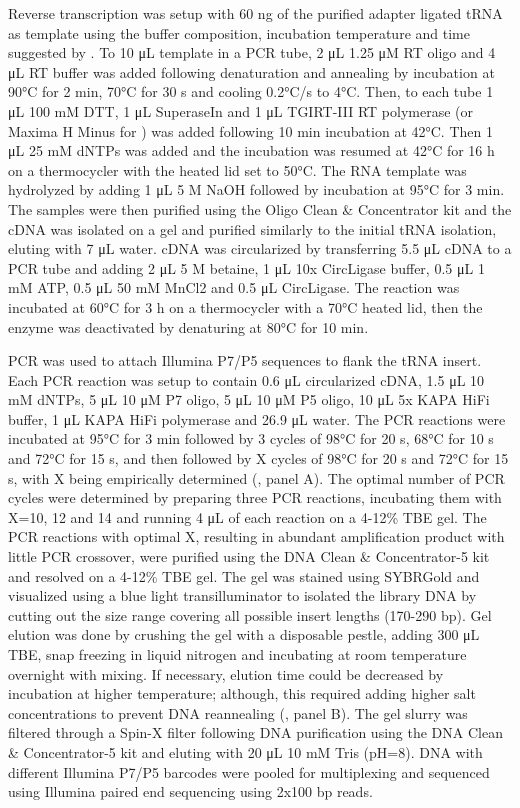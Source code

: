 \documentclass[9pt,lineno]{elife}
\begin{document}
Reverse transcription was setup with 60 ng of the purified adapter ligated tRNA as template using the buffer composition, incubation temperature and time suggested by \cite{Behrens2021-gb}.
To 10 μL template in a PCR tube, 2 μL 1.25 μM RT oligo and 4 μL RT buffer was added following denaturation and annealing by incubation at 90°C for 2 min, 70°C for 30 s and cooling 0.2°C/s to 4°C.
Then, to each tube 1 μL 100 mM DTT, 1 μL SuperaseIn and 1 μL TGIRT-III RT polymerase (or Maxima H Minus for ) was added following 10 min incubation at 42°C.
Then 1 μL 25 mM dNTPs was added and the incubation was resumed at 42°C for 16 h on a thermocycler with the heated lid set to 50°C.
The RNA template was hydrolyzed by adding 1 μL 5 M NaOH followed by incubation at 95°C for 3 min.
The samples were then purified using the Oligo Clean \& Concentrator kit and the cDNA was isolated on a gel and purified similarly to the initial tRNA isolation, eluting with 7 μL water.
cDNA was circularized by transferring 5.5 μL cDNA to a PCR tube and adding 2 μL 5 M betaine, 1 μL 10x CircLigase buffer, 0.5 μL 1 mM ATP, 0.5 μL 50 mM MnCl2 and 0.5 μL CircLigase.
The reaction was incubated at 60°C for 3 h on a thermocycler with a 70°C heated lid, then the enzyme was deactivated by denaturing at 80°C for 10 min.

PCR was used to attach Illumina P7/P5 sequences to flank the tRNA insert.
Each PCR reaction was setup to contain 0.6 μL circularized cDNA, 1.5 μL 10 mM dNTPs, 5 μL 10 μM P7 oligo, 5 μL 10 μM P5 oligo, 10 μL 5x KAPA HiFi buffer, 1 μL KAPA HiFi polymerase and 26.9 μL water.
The PCR reactions were incubated at 95°C for 3 min followed by 3 cycles of 98°C for 20 s, 68°C for 10 s and 72°C for 15 s, and then followed by X cycles of 98°C for 20 s and 72°C for 15 s, with X being empirically determined (, panel A).
The optimal number of PCR cycles were determined by preparing three PCR reactions, incubating them with X=10, 12 and 14 and running 4 μL of each reaction on a 4-12\% TBE gel.
The PCR reactions with optimal X, resulting in abundant amplification product with little PCR crossover, were purified using the DNA Clean \& Concentrator-5 kit and resolved on a 4-12\% TBE gel.
The gel was stained using SYBRGold and visualized using a blue light transilluminator to isolated the library DNA by cutting out the size range covering all possible insert lengths (170-290 bp).
Gel elution was done by crushing the gel with a disposable pestle, adding 300 μL TBE, snap freezing in liquid nitrogen and incubating at room temperature overnight with mixing.
If necessary, elution time could be decreased by incubation at higher temperature; although, this required adding higher salt concentrations to prevent DNA reannealing (, panel B).
The gel slurry was filtered through a Spin-X filter following DNA purification using the DNA Clean \& Concentrator-5 kit and eluting with 20 μL 10 mM Tris (pH=8).
DNA with different Illumina P7/P5 barcodes were pooled for multiplexing and sequenced using Illumina paired end sequencing using 2x100 bp reads.
\end{document}
